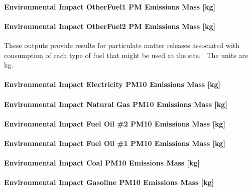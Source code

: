 \paragraph{Environmental Impact OtherFuel1 PM Emissions Mass {[}kg{]}}\label{environmental-impact-otherfuel1-pm-emissions-mass-kg}

\paragraph{Environmental Impact OtherFuel2 PM Emissions Mass {[}kg{]}}\label{environmental-impact-otherfuel2-pm-emissions-mass-kg}

These outputs provide results for particulate matter releases associated with consumption of each type of fuel that might be used at the site.~ The units are kg.

\paragraph{Environmental Impact Electricity PM10 Emissions Mass {[}kg{]}}\label{environmental-impact-electricity-pm10-emissions-mass-kg}

\paragraph{Environmental Impact Natural Gas PM10 Emissions Mass {[}kg{]}}\label{environmental-impact-natural-gas-pm10-emissions-mass-kg}

\paragraph{Environmental Impact Fuel Oil \#2 PM10 Emissions Mass {[}kg{]}}\label{environmental-impact-fuel-oil-2-pm10-emissions-mass-kg}

\paragraph{Environmental Impact Fuel Oil \#1 PM10 Emissions Mass {[}kg{]}}\label{environmental-impact-fuel-oil-1-pm10-emissions-mass-kg}

\paragraph{Environmental Impact Coal PM10 Emissions Mass {[}kg{]}}\label{environmental-impact-coal-pm10-emissions-mass-kg}

\paragraph{Environmental Impact Gasoline PM10 Emissions Mass {[}kg{]}}\label{environmental-impact-gasoline-pm10-emissions-mass-kg}

